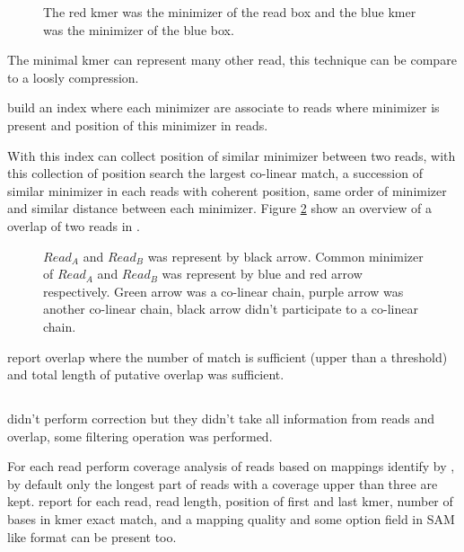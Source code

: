 \documentclass[main]{subfiles}
\begin{document}
\begin{figure}[ht]
    \centering
    
    \caption{The red kmer was the minimizer of the read box and the blue kmer was the minimizer of the blue box.}
    \label{sota:fig:miniasm:minimizer}
\end{figure}

The minimal kmer can represent many other read, this technique can be compare to a loosly compression.

\minimap build an index where each minimizer are associate to reads where minimizer is present and position of this minimizer in reads.

With this index \minimap can collect position of similar minimizer between two reads, with this collection of position \minimap search the largest co-linear match, a succession of similar minimizer in each reads with coherent position, same order of minimizer and similar distance between each minimizer. Figure \ref{sota:fig:miniasm:mapping} show an overview of a overlap of two reads in \minimap.

\begin{figure}[ht]
    \centering
    
    \caption{$Read_A$ and $Read_B$ was represent by black arrow. Common minimizer of $Read_A$ and $Read_B$ was represent by blue and red arrow respectively. Green arrow was a co-linear chain, purple arrow was another co-linear chain, black arrow didn't participate to a co-linear chain.}
    \label{sota:fig:miniasm:mapping}
\end{figure}

\minimap report overlap where the number of match is sufficient (upper than a threshold) and  total length of putative overlap was sufficient. 

\subsection{\miniasm}

\miniasm didn't perform correction but they didn't take all information from reads and overlap, some filtering operation was performed.

For each read \miniasm perform coverage analysis of reads based on mappings identify by \minimap, by default only the longest part of reads with a coverage upper than three are kept. \minimap report for each read, read length, position of first and last kmer, number of bases in kmer exact match,  and a mapping quality and some option field in SAM like format can be present too.
\end{document}
